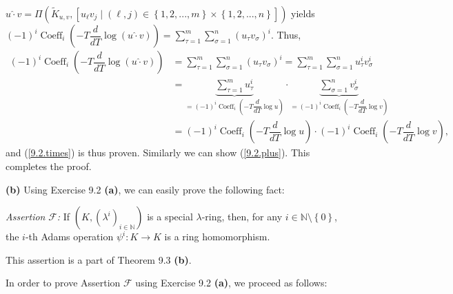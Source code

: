 \documentclass[numbers=enddot,12pt,final,onecolumn,notitlepage]{scrartcl}%
\begin{document}
$u\widehat{\cdot}v=\Pi\left(  \widetilde{K}_{u,v},\left[  u_{\ell}v_{j}%
\mid\left(  \ell,j\right)  \in\left\{  1,2,...,m\right\}  \times\left\{
1,2,...,n\right\}  \right]  \right)  $ yields $\left(  -1\right)
^{i}\operatorname*{Coeff}\nolimits_{i}\left(  -T\dfrac{d}{dT}\log\left(
u\widehat{\cdot}v\right)  \right)  =\sum\limits_{\tau=1}^{m}\sum
\limits_{\sigma=1}^{n}\left(  u_{\tau}v_{\sigma}\right)  ^{i}$. Thus,%
\begin{align*}
\left(  -1\right)  ^{i}\operatorname*{Coeff}\nolimits_{i}\left(  -T\dfrac
{d}{dT}\log\left(  u\widehat{\cdot}v\right)  \right)   &  =\sum\limits_{\tau
=1}^{m}\sum\limits_{\sigma=1}^{n}\left(  u_{\tau}v_{\sigma}\right)  ^{i}%
=\sum\limits_{\tau=1}^{m}\sum\limits_{\sigma=1}^{n}u_{\tau}^{i}v_{\sigma}%
^{i}\\
&  =\underbrace{\sum\limits_{\tau=1}^{m}u_{\tau}^{i}}_{=\left(  -1\right)
^{i}\operatorname*{Coeff}\nolimits_{i}\left(  -T\dfrac{d}{dT}\log u\right)
}\cdot\underbrace{\sum\limits_{\sigma=1}^{n}v_{\sigma}^{i}}_{=\left(
-1\right)  ^{i}\operatorname*{Coeff}\nolimits_{i}\left(  -T\dfrac{d}{dT}\log
v\right)  }\\
&  =\left(  -1\right)  ^{i}\operatorname*{Coeff}\nolimits_{i}\left(
-T\dfrac{d}{dT}\log u\right)  \cdot\left(  -1\right)  ^{i}%
\operatorname*{Coeff}\nolimits_{i}\left(  -T\dfrac{d}{dT}\log v\right)  ,
\end{align*}
and (\ref{9.2.times}) is thus proven. Similarly we can show (\ref{9.2.plus}).
This completes the proof.

\textbf{(b)} Using Exercise 9.2 \textbf{(a)}, we can easily prove the
following fact:

\textit{Assertion }$\mathcal{F}$\textit{:} If $\left(  K,\left(  \lambda
^{i}\right)  _{i\in\mathbb{N}}\right)  $ is a special $\lambda$-ring, then,
for any $i\in\mathbb{N}\setminus\left\{  0\right\}  $, the $i$-th Adams
operation $\psi^{i}:K\rightarrow K$ is a ring homomorphism.

This assertion is a part of Theorem 9.3 \textbf{(b)}.

In order to prove Assertion $\mathcal{F}$ using Exercise 9.2 \textbf{(a)}, we
proceed as follows:
\end{document}

